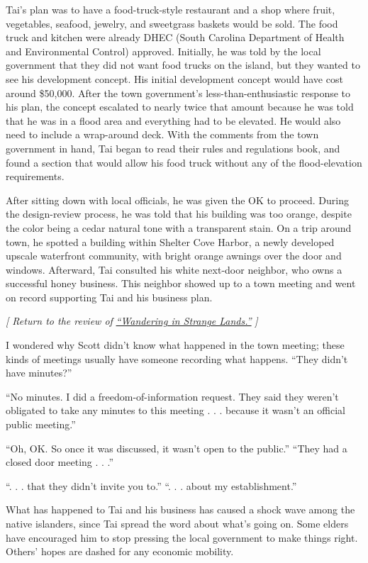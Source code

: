 Tai's plan was to have a food-truck-style restaurant and a shop where
fruit, vegetables, seafood, jewelry, and sweetgrass baskets would be
sold. The food truck and kitchen were already DHEC (South Carolina
Department of Health and Environmental Control) approved. Initially, he
was told by the local government that they did not want food trucks on
the island, but they wanted to see his development concept. His initial
development concept would have cost around \$50,000. After the town
government's less-than-enthusiastic response to his plan, the concept
escalated to nearly twice that amount because he was told that he was in
a flood area and everything had to be elevated. He would also need to
include a wrap-around deck. With the comments from the town government
in hand, Tai began to read their rules and regulations book, and found a
section that would allow his food truck without any of the
flood-elevation requirements.

After sitting down with local officials, he was given the OK to proceed.
During the design-review process, he was told that his building was too
orange, despite the color being a cedar natural tone with a transparent
stain. On a trip around town, he spotted a building within Shelter Cove
Harbor, a newly developed upscale waterfront community, with bright
orange awnings over the door and windows. Afterward, Tai consulted his
white next-door neighbor, who owns a successful honey business. This
neighbor showed up to a town meeting and went on record supporting Tai
and his business plan.

\emph{{[} Return to the review of}
\href{https://www.nytimes3xbfgragh.onion/2020/08/03/books/review/wandering-in-strange-lands-morgan-jerkins.html}{\emph{``Wandering
in Strange Lands.''}} \emph{{]}}

I wondered why Scott didn't know what happened in the town meeting;
these kinds of meetings usually have someone recording what happens.
``They didn't have minutes?''

``No minutes. I did a freedom-of-information request. They said they
weren't obligated to take any minutes to this meeting . . . because it
wasn't an official public meeting.''

``Oh, OK. So once it was discussed, it wasn't open to the public.''
``They had a closed door meeting . . .''

``. . . that they didn't invite you to.'' ``. . . about my
establishment.''

What has happened to Tai and his business has caused a shock wave among
the native islanders, since Tai spread the word about what's going on.
Some elders have encouraged him to stop pressing the local government to
make things right. Others' hopes are dashed for any economic mobility.

